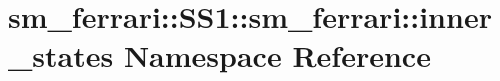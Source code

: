 \hypertarget{namespacesm__ferrari_1_1SS1_1_1sm__ferrari_1_1inner__states}{}\section{sm\+\_\+ferrari\+:\+:S\+S1\+:\+:sm\+\_\+ferrari\+:\+:inner\+\_\+states Namespace Reference}
\label{namespacesm__ferrari_1_1SS1_1_1sm__ferrari_1_1inner__states}
